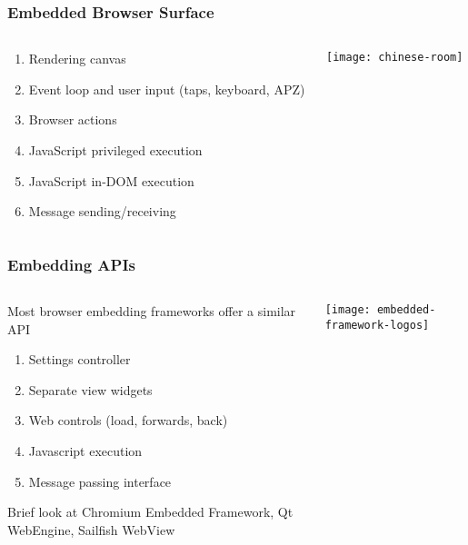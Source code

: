 \documentclass[
	notes=none,
	aspectratio=169
]{beamer}
\begin{document}
\begin{frame}
\frametitle{Embedded Browser Surface}

\begin{columns}[T]
\begin{column}[T]{0.7\textwidth}
\setlength{\parskip}{0.5em}

\vspace{1.0cm}
\begin{enumerate}
\setlength{\parskip}{0.5em}
\item Rendering canvas
\item Event loop and user input (taps, keyboard, APZ)
\item Browser actions
\item JavaScript privileged execution
\item JavaScript in-DOM execution
\item Message sending/receiving
\end{enumerate}

\end{column}
\begin{column}[T]{0.3\textwidth}
\setlength{\parskip}{0.5em}

\vspace{0.5cm}
\texttt{[image: chinese-room]}

\end{column}
\end{columns}

\end{frame}
\note{
}


\begin{frame}
\frametitle{Embedding APIs}

\begin{columns}[T]
\begin{column}[T]{0.73\textwidth}
\setlength{\parskip}{0.5em}

\vspace{1.0cm}
Most browser embedding frameworks offer a similar API
\begin{enumerate}
\setlength{\parskip}{0.5em}
\item Settings controller
\item Separate view widgets
\item Web controls (load, forwards, back)
\item Javascript execution
\item Message passing interface
\end{enumerate}
Brief look at Chromium Embedded Framework, Qt WebEngine, Sailfish WebView

\end{column}
\begin{column}[T]{0.2\textwidth}
\setlength{\parskip}{0.5em}

\vspace{0.5cm}
\hspace{-1.0cm}
\texttt{[image: embedded-framework-logos]}

\end{column}
\end{columns}

\end{frame}
\note{
}
\end{document}
